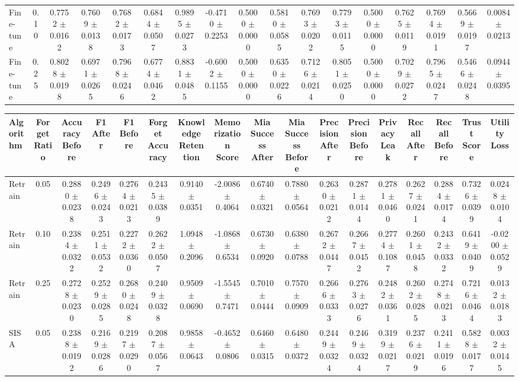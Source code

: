 \begin{table}[t]
\begin{tabular}{lcccccccccccccccc}
Fine-tune & 0.10 & 0.7752 $\pm$ 0.0162 & 0.7609 $\pm$ 0.0138 & 0.7682 $\pm$ 0.0173 & 0.6844 $\pm$ 0.0507 & 0.9895 $\pm$ 0.0273 & -0.4710 $\pm$ 0.2253 & 0.5000 $\pm$ 0.0000 & 0.5810 $\pm$ 0.0585 & 0.7693 $\pm$ 0.0202 & 0.7793 $\pm$ 0.0115 & 0.5000 $\pm$ 0.0000 & 0.7625 $\pm$ 0.0119 & 0.7694 $\pm$ 0.0191 & 0.5669 $\pm$ 0.0197 & 0.0084 $\pm$ 0.0213 \\
Fine-tune & 0.25 & 0.8028 $\pm$ 0.0198 & 0.6971 $\pm$ 0.0265 & 0.7968 $\pm$ 0.0246 & 0.6774 $\pm$ 0.0462 & 0.8831 $\pm$ 0.0485 & -0.6002 $\pm$ 0.1155 & 0.5000 $\pm$ 0.0000 & 0.6350 $\pm$ 0.0226 & 0.7126 $\pm$ 0.0214 & 0.8051 $\pm$ 0.0250 & 0.5000 $\pm$ 0.0000 & 0.7029 $\pm$ 0.0272 & 0.7965 $\pm$ 0.0247 & 0.5466 $\pm$ 0.0248 & 0.0944 $\pm$ 0.0395 \\
\bottomrule
\end{tabular}
\vspace{2mm}
\begin{tabular}{lcccccccccccccccc}
\toprule
Algorithm & Forget Ratio & Accuracy Before & F1 After & F1 Before & Forget Accuracy & Knowledge Retention & Memorization Score & Mia Success After & Mia Success Before & Precision After & Precision Before & Privacy Leak & Recall After & Recall Before & Trust Score & Utility Loss \\
\midrule
Retrain & 0.05 & 0.2880 $\pm$ 0.0238 & 0.2496 $\pm$ 0.0243 & 0.2764 $\pm$ 0.0213 & 0.2435 $\pm$ 0.0389 & 0.9140 $\pm$ 0.0351 & -2.0086 $\pm$ 0.4064 & 0.6740 $\pm$ 0.0321 & 0.7880 $\pm$ 0.0564 & 0.2630 $\pm$ 0.0212 & 0.2871 $\pm$ 0.0144 & 0.2781 $\pm$ 0.0460 & 0.2627 $\pm$ 0.0241 & 0.2884 $\pm$ 0.0174 & 0.7326 $\pm$ 0.0399 & 0.0248 $\pm$ 0.0104 \\
Retrain & 0.10 & 0.2384 $\pm$ 0.0322 & 0.2511 $\pm$ 0.0532 & 0.2272 $\pm$ 0.0360 & 0.2622 $\pm$ 0.0507 & 1.0948 $\pm$ 0.2096 & -1.0868 $\pm$ 0.6534 & 0.6730 $\pm$ 0.0920 & 0.6380 $\pm$ 0.0788 & 0.2672 $\pm$ 0.0447 & 0.2667 $\pm$ 0.0452 & 0.2774 $\pm$ 0.1087 & 0.2601 $\pm$ 0.0458 & 0.2432 $\pm$ 0.0332 & 0.6419 $\pm$ 0.0409 & -0.0200 $\pm$ 0.0529 \\
Retrain & 0.25 & 0.2728 $\pm$ 0.0230 & 0.2529 $\pm$ 0.0285 & 0.2680 $\pm$ 0.0248 & 0.2409 $\pm$ 0.0328 & 0.9509 $\pm$ 0.0690 & -1.5545 $\pm$ 0.7471 & 0.7010 $\pm$ 0.0444 & 0.7570 $\pm$ 0.0909 & 0.2666 $\pm$ 0.0333 & 0.2763 $\pm$ 0.0276 & 0.2482 $\pm$ 0.0361 & 0.2602 $\pm$ 0.0285 & 0.2748 $\pm$ 0.0213 & 0.7216 $\pm$ 0.0464 & 0.0132 $\pm$ 0.0183 \\
SISA & 0.05 & 0.2388 $\pm$ 0.0192 & 0.2169 $\pm$ 0.0286 & 0.2197 $\pm$ 0.0290 & 0.2087 $\pm$ 0.0567 & 0.9858 $\pm$ 0.0643 & -0.4652 $\pm$ 0.0806 & 0.6460 $\pm$ 0.0315 & 0.6480 $\pm$ 0.0372 & 0.2449 $\pm$ 0.0324 & 0.2469 $\pm$ 0.0324 & 0.3199 $\pm$ 0.0217 & 0.2376 $\pm$ 0.0219 & 0.2411 $\pm$ 0.0196 & 0.5828 $\pm$ 0.0177 & 0.0032 $\pm$ 0.0145 \\

\end{tabular}
\end{table}
